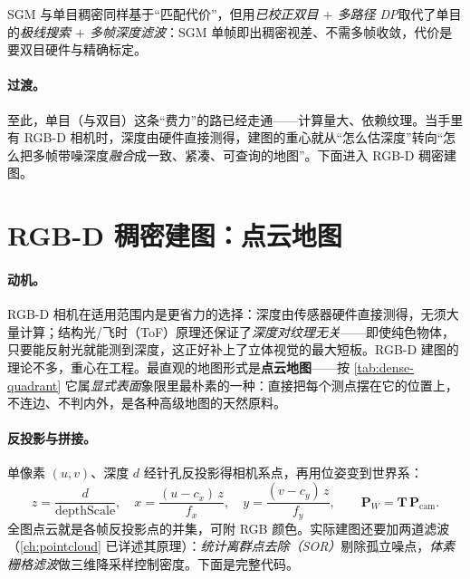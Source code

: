 \begin{insight}
SGM 与单目稠密同样基于“匹配代价”，但用\emph{已校正双目 $+$ 多路径 DP}取代了单目的\emph{极线搜索 $+$ 多帧深度滤波}：SGM 单帧即出稠密视差、不需多帧收敛，代价是要双目硬件与精确标定。
\end{insight}

\paragraph{过渡。}
至此，单目（与双目）这条“费力”的路已经走通——计算量大、依赖纹理。当手里有 RGB-D 相机时，深度由硬件直接测得，建图的重心就从“怎么估深度”转向“怎么把多帧带噪深度\emph{融合}成一致、紧凑、可查询的地图”。下面进入 RGB-D 稠密建图。

\section{RGB-D 稠密建图：点云地图}
\label{sec:dense-rgbd-pc}

\paragraph{动机。}
RGB-D 相机在适用范围内是更省力的选择：深度由传感器硬件直接测得，无须大量计算；结构光/飞时（ToF）原理还保证了\emph{深度对纹理无关}——即使纯色物体，只要能反射光就能测到深度，这正好补上了立体视觉的最大短板\cite{gaoxiang2019slam14}。RGB-D 建图的理论不多，重心在工程。最直观的地图形式是\textbf{点云地图}——按 \cref{tab:dense-quadrant} 它属\emph{显式表面}象限里最朴素的一种：直接把每个测点摆在它的位置上，不连边、不判内外，是各种高级地图的天然原料。

\paragraph{反投影与拼接。}
单像素 $(u,v)$、深度 $d$ 经针孔反投影得相机系点，再用位姿变到世界系：
\begin{equation}
  z=\frac{d}{\text{depthScale}},\quad x=\frac{(u-c_x)\,z}{f_x},\quad y=\frac{(v-c_y)\,z}{f_y},\qquad
  \mathbf{P}_W=\mathbf{T}\,\mathbf{P}_{\mathrm{cam}}.
  \label{eq:dense-rgbd-backproj}
\end{equation}
全图点云就是各帧反投影点的并集，可附 RGB 颜色。实际建图还要加两道滤波（\cref{ch:pointcloud} 已详述其原理）：\emph{统计离群点去除（SOR）}剔除孤立噪点，\emph{体素栅格滤波}做三维降采样控制密度。下面是完整代码。

